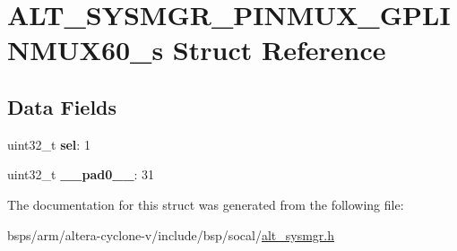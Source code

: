 \hypertarget{structALT__SYSMGR__PINMUX__GPLINMUX60__s}{}\section{A\+L\+T\+\_\+\+S\+Y\+S\+M\+G\+R\+\_\+\+P\+I\+N\+M\+U\+X\+\_\+\+G\+P\+L\+I\+N\+M\+U\+X60\+\_\+s Struct Reference}
\label{structALT__SYSMGR__PINMUX__GPLINMUX60__s}
\subsection*{Data Fields}
\begin{DoxyCompactItemize}
\item 
\mbox{\label{structALT__SYSMGR__PINMUX__GPLINMUX60__s_afae81d66ee067fe88ad567ffbf64a151}} 
uint32\+\_\+t {\bfseries sel}\+: 1
\item 
\mbox{\label{structALT__SYSMGR__PINMUX__GPLINMUX60__s_ab52b6ec4104d1886279b5acc9f1b094b}} 
uint32\+\_\+t {\bfseries \+\_\+\+\_\+pad0\+\_\+\+\_\+}\+: 31
\end{DoxyCompactItemize}


The documentation for this struct was generated from the following file\+:\begin{DoxyCompactItemize}
\item 
bsps/arm/altera-\/cyclone-\/v/include/bsp/socal/\mbox{\hyperlink{alt__sysmgr_8h}{alt\+\_\+sysmgr.\+h}}\end{DoxyCompactItemize}
